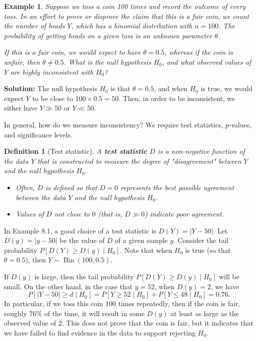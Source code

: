 \documentclass[10pt]{article}
\DeclareMathOperator{\Bin}{Bin}
\theoremstyle{newstyle}
\newtheorem{defn}[thm]{Definition}
\newtheorem{exmp}[thm]{Example}
\begin{document}
\begin{exmp}
Suppose we toss a coin 100 times and record the outcome of every toss. In an effort to prove or 
disprove the claim that this is a fair coin, we count the number of heads $Y$, which 
has a binomial distribution with $n = 100$. The probability of getting heads on a given toss 
is an unknown parameter $\theta$. 

If this is a fair coin, we would expect to have $\theta = 0.5$, whereas if the coin is unfair, 
then $\theta \neq 0.5$. What is the null hypothesis $H_0$, and what observed values of $Y$ 
are highly inconsistent with $H_0$?
\end{exmp}

{\color{blue}
{\bf Solution:} The null hypothesis $H_0$ is that $\theta = 0.5$, and when $H_0$ is true, 
we would expect $Y$ to be close to $100 \times 0.5 = 50$. Then, in order to be inconsistent, 
we either have $Y \gg 50$ or $Y \ll 50$.}

In general, how do we measure inconsistency? We require test statistics, $p$-values, and 
significance levels. 

\begin{defn}[Test statistic]
A {\bf test statistic} $D$ is a non-negative function of the data $Y$ that is constructed to 
measure the degree of "disagreement" between $Y$ and the null hypothesis $H_0$. 
\begin{itemize}
    \item Often, $D$ is defined so that $D = 0$ represents the best possible agreement between the 
    data $Y$ and the null hypothesis $H_0$. 
    \item Values of $D$ not close to $0$ (that is, $D \gg 0$) indicate poor agreement. 
\end{itemize}
\end{defn}

In Example 8.1, a good choice of a test statistic is $D(Y) = |Y - 50|$. Let 
$D(y) = |y - 50|$ be the value of $D$ of a given sample $y$. Consider the tail probability 
$P[D(Y) \geq D(y) \mid H_0]$. Note that when $H_0$ is true (so that $\theta = 0.5$), then 
$Y \sim \Bin(100, 0.5)$. 

If $D(y)$ is large, then the tail probability $P[D(Y) \geq D(y) \mid H_0]$
will be small. On the other hand, in the case that $y = 52$, when $D(y) = 2$, we have
\[ P[|Y - 50| \geq d \mid H_0] = P[Y \geq 52 \mid H_0] + P[Y \leq 48 \mid H_0] = 0.76. \]
In particular, if we toss this coin 100 times repeatedly, then if the coin is fair, 
roughly $76\%$ of the time, it will result in some $D(y)$ at least as large as the observed value of $2$.
This does not prove that the coin is fair, but it indicates that we have failed to find evidence in the 
data to support rejecting $H_0$. 
\end{document}

